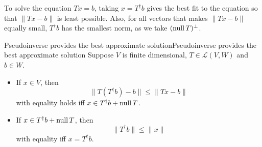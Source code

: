 \documentclass[../main.tex]{subfiles}
\begin{document}
\begin{remark}
To solve the equation $Tx=b$, taking $x = T ^\dagger b$ gives the best fit to the equation so that $\|Tx-b\|$ is least possible. Also, for all vectors that makes $\|Tx-b\|$ equally small, $T ^\dagger b$ has the smallest norm, as we take $(\operatorname{null} T)^{\perp}$.
\end{remark}
\begin{theorem}{Pseudoinverse provides the best approximate solution}{Pseudoinverse provides the best approximate solution}
Suppose $V$ is finite dimensional, $T\in \mathscr{L}(V,W)$ and $b\in W$.
\begin{itemize}
\item If $x\in V$, then
	\begin{equation*}
	\|T(T ^\dagger b)-b\| \leq \|Tx-b\|
	\end{equation*}
	with equality holds iff $x\in T ^\dagger b+ \operatorname{null} T$.
\item If $x\in T ^\dagger b+\operatorname{null} T$, then
	\begin{equation*}
	\|T ^\dagger b\|\leq \|x\|
	\end{equation*}
	with equality iff $x = T ^\dagger b$.
\end{itemize}
\end{theorem}
\end{document}
